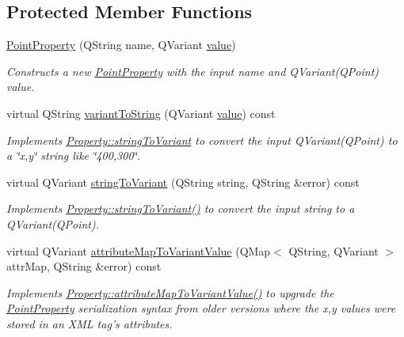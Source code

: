 \subsection*{Protected Member Functions}
\begin{DoxyCompactItemize}
\item 
\hypertarget{class_picto_1_1_point_property_aa4f0c98d51374dde6d8ed1ee159a3a00}{\hyperlink{class_picto_1_1_point_property_aa4f0c98d51374dde6d8ed1ee159a3a00}{Point\-Property} (Q\-String name, Q\-Variant \hyperlink{class_picto_1_1_property_a69540c9d4f9a4b0b128b4c6a876d67ca}{value})}\label{class_picto_1_1_point_property_aa4f0c98d51374dde6d8ed1ee159a3a00}

\begin{DoxyCompactList}\small\item\em Constructs a new \hyperlink{class_picto_1_1_point_property}{Point\-Property} with the input name and Q\-Variant(\-Q\-Point) value. \end{DoxyCompactList}\item 
\hypertarget{class_picto_1_1_point_property_ab9a69b56cc879ad73c74c8830e70fe34}{virtual Q\-String \hyperlink{class_picto_1_1_point_property_ab9a69b56cc879ad73c74c8830e70fe34}{variant\-To\-String} (Q\-Variant \hyperlink{class_picto_1_1_property_a69540c9d4f9a4b0b128b4c6a876d67ca}{value}) const }\label{class_picto_1_1_point_property_ab9a69b56cc879ad73c74c8830e70fe34}

\begin{DoxyCompactList}\small\item\em Implements \hyperlink{class_picto_1_1_property_a97d52011d6db190c5c28a21d76ac1d3b}{Property\-::string\-To\-Variant} to convert the input Q\-Variant(\-Q\-Point) to a \char`\"{}x,y\char`\"{} string like \char`\"{}400,300\char`\"{}. \end{DoxyCompactList}\item 
virtual Q\-Variant \hyperlink{class_picto_1_1_point_property_a9e0047b5c75ff8cca820dbac481450f8}{string\-To\-Variant} (Q\-String string, Q\-String \&error) const 
\begin{DoxyCompactList}\small\item\em Implements \hyperlink{class_picto_1_1_property_a97d52011d6db190c5c28a21d76ac1d3b}{Property\-::string\-To\-Variant()} to convert the input string to a Q\-Variant(\-Q\-Point). \end{DoxyCompactList}\item 
virtual Q\-Variant \hyperlink{class_picto_1_1_point_property_a39cb9590e6f361eb991c58d9ef7d4da7}{attribute\-Map\-To\-Variant\-Value} (Q\-Map$<$ Q\-String, Q\-Variant $>$ attr\-Map, Q\-String \&error) const 
\begin{DoxyCompactList}\small\item\em Implements \hyperlink{class_picto_1_1_property_a91505cad6a9848cc849e6cd0bc7641aa}{Property\-::attribute\-Map\-To\-Variant\-Value()} to upgrade the \hyperlink{class_picto_1_1_point_property}{Point\-Property} serialization syntax from older versions where the x,y values were stored in an X\-M\-L tag's attributes. \end{DoxyCompactList}\end{DoxyCompactItemize}
